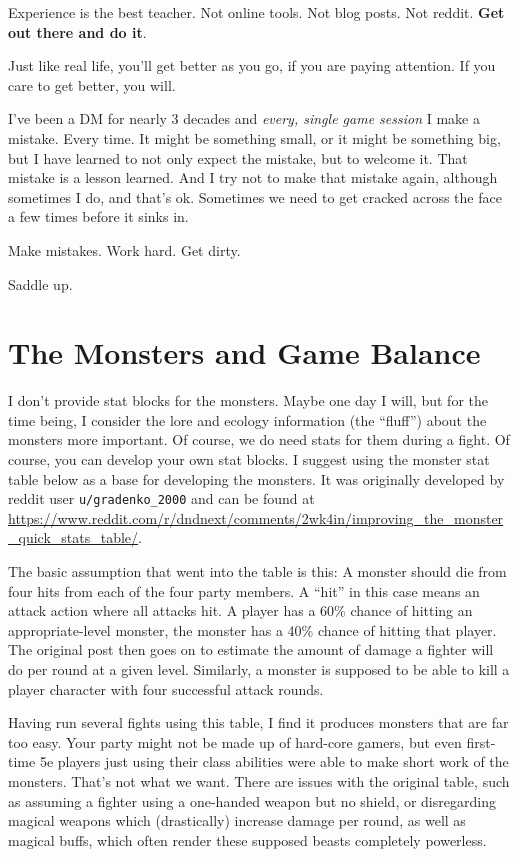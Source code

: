 Experience is the best teacher. Not online tools. Not blog posts. Not reddit. \textbf{Get out there and do it}.

Just like real life, you'll get better as you go, if you are paying attention. If you care to get better, you will.

I've been a DM for nearly 3 decades and \emph{every, single game session} I make a mistake. Every time. It might be something small, or it might be something big, but I have learned to not only expect the mistake, but to welcome it. That mistake is a lesson learned. And I try not to make that mistake again, although sometimes I do, and that's ok. Sometimes we need to get cracked across the face a few times before it sinks in.

Make mistakes. Work hard. Get dirty.

Saddle up.

\chapter{The Monsters and Game Balance}
I don't provide stat blocks for the monsters. Maybe one day I will, but for the time being, I consider the lore and ecology information (the ``fluff'') about the monsters more important. Of course, we do need stats for them during a fight. Of course, you can develop your own stat blocks. I suggest using the monster stat table below as a base for developing the monsters. It was originally developed by reddit user \texttt{u/gradenko\_2000} and can be found at \url{https://www.reddit.com/r/dndnext/comments/2wk4in/improving_the_monster_quick_stats_table/}.

The basic assumption that went into the table is this: A monster should die from four hits from each of the four party members. A ``hit'' in this case means an attack action where all attacks hit. A player has a 60\% chance of hitting an appropriate-level monster, the monster has a 40\% chance of hitting that player. The original post then goes on to estimate the amount of damage a fighter will do per round at a given level. Similarly, a monster is supposed to be able to kill a player character with four successful attack rounds.

Having run several fights using this table, I find it produces monsters that are far too easy. Your party might not be made up of hard-core gamers, but even first-time 5e players just using their class abilities were able to make short work of the monsters. That's not what we want. There are issues with the original table, such as assuming a fighter using a one-handed weapon but no shield, or disregarding magical weapons which (drastically) increase damage per round, as well as magical buffs, which often render these supposed beasts completely powerless.


